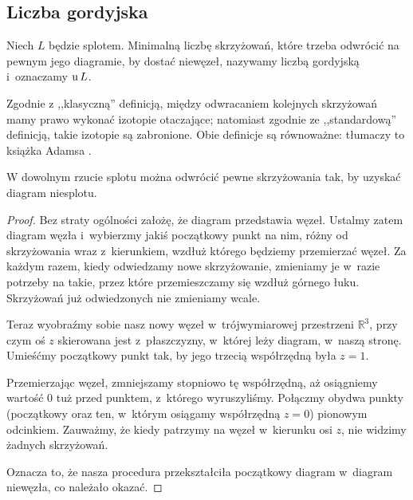 \subsection{Liczba gordyjska}
%

\begin{definition}
    Niech $L$ będzie splotem.
    Minimalną liczbę skrzyżowań, które trzeba odwrócić na pewnym jego diagramie, by dostać niewęzeł, nazywamy liczbą gordyjską i~oznaczamy $\operatorname{u} L$.
\end{definition}

Zgodnie z ,,klasyczną'' definicją, między odwracaniem kolejnych skrzyżowań mamy prawo wykonać izotopie otaczające; natomiast zgodnie ze ,,standardową'' definicją, takie izotopie są zabronione.
Obie definicje są równoważne: tłumaczy to książka Adamsa \cite[s. 58]{adams94}.

\begin{lemma}
    \label{lem:unknotting_well_defined}
    W dowolnym rzucie splotu można odwrócić pewne skrzyżowania tak, by uzyskać diagram niesplotu.
\end{lemma}

\begin{proof}
    Bez straty ogólności założę, że diagram przedstawia węzeł.
    Ustalmy zatem diagram węzła i~wybierzmy jakiś początkowy punkt na nim, różny od skrzyżowania wraz z~kierunkiem, wzdłuż którego będziemy przemierzać węzeł.
    Za każdym razem, kiedy odwiedzamy nowe skrzyżowanie, zmieniamy je w~razie potrzeby na takie, przez które przemieszczamy się wzdłuż górnego łuku.
    Skrzyżowań już odwiedzonych nie zmieniamy wcale.

    Teraz wyobraźmy sobie nasz nowy węzeł w~trójwymiarowej przestrzeni $\mathbb R^3$, przy czym oś $z$ skierowana jest z~płaszczyzny, w~której leży diagram, w~naszą stronę.
    Umieśćmy początkowy punkt tak, by jego trzecią współrzędną była $z = 1$.

    Przemierzając węzeł, zmniejszamy stopniowo tę współrzędną, aż osiągniemy wartość $0$ tuż przed punktem, z~którego wyruszyliśmy.
    Połączmy obydwa punkty (początkowy oraz ten, w~którym osiągamy współrzędną $z = 0$) pionowym odcinkiem.
    Zauważmy, że kiedy patrzymy na węzeł w~kierunku osi $z$, nie widzimy żadnych skrzyżowań.

    Oznacza to, że nasza procedura przekształciła początkowy diagram w~diagram niewęzła, co należało okazać.
\end{proof}

